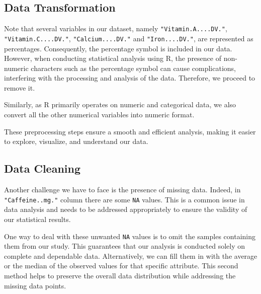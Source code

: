 \documentclass[
]{article}
\newenvironment{Shaded}{\begin{snugshade}}{\end{snugshade}}
\newcommand{\CommentTok}[1]{\textcolor[rgb]{0.56,0.35,0.01}{\textit{#1}}}
\newcommand{\FunctionTok}[1]{\textcolor[rgb]{0.13,0.29,0.53}{\textbf{#1}}}
\newcommand{\NormalTok}[1]{#1}
\newcommand{\OtherTok}[1]{\textcolor[rgb]{0.56,0.35,0.01}{#1}}
\newcommand{\SpecialCharTok}[1]{\textcolor[rgb]{0.81,0.36,0.00}{\textbf{#1}}}
\newcommand{\StringTok}[1]{\textcolor[rgb]{0.31,0.60,0.02}{#1}}
\begin{document}
\subsection{Data Transformation}\label{data-transformation}

Note that several variables in our dataset, namely
\texttt{"Vitamin.A....DV."}, \texttt{"Vitamin.C....DV."},
\texttt{"Calcium....DV."} and \texttt{"Iron....DV."}, are represented as
percentages. Consequently, the percentage symbol is included in our
data. However, when conducting statistical analysis using R, the
presence of non-numeric characters such as the percentage symbol can
cause complications, interfering with the processing and analysis of the
data. Therefore, we proceed to remove it.

Similarly, as R primarily operates on numeric and categorical data, we
also convert all the other numerical variables into numeric format.

These preprocessing steps ensure a smooth and efficient analysis, making
it easier to explore, visualize, and understand our data.

\begin{Shaded}
\end{Shaded}

\subsection{Data Cleaning}\label{data-cleaning}

Another challenge we have to face is the presence of missing data.
Indeed, in \texttt{"Caffeine..mg."} column there are some \texttt{NA}
values. This is a common issue in data analysis and needs to be
addressed appropriately to ensure the validity of our statistical
results.

One way to deal with these unwanted \texttt{NA} values is to omit the
samples containing them from our study. This guarantees that our
analysis is conducted solely on complete and dependable data.
Alternatively, we can fill them in with the average or the median of the
observed values for that specific attribute. This second method helps to
preserve the overall data distribution while addressing the missing data
points.
\end{document}
